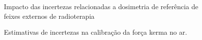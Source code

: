 \documentclass[11pt,a4paper]{article}
\begin{document}
\begin{figure}[h]
    \centering
    \caption{Impacto das incertezas relacionadas a dosimetria de referência de feixes externos de radioterapia}
    \label{fig:incertezaDosimetricaExternalBeam}
\end{figure}

\begin{figure}[h]
    \centering
    \caption{Estimativas de incertezas na calibração da força kerma no ar.}
	\label{fig:incertezaCalibracaoKermaAr}
\end{figure}



\end{document}
